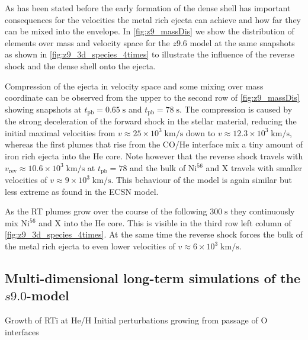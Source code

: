 \documentclass[fleqn,usenatbib]{mnras}
\newcommand{\nickel}{$\mathrm{Ni^{56}}$\xspace}
\newcommand{\tracer}{$\mathrm{X}$\xspace}
\newcommand{\COM}[1]{{\color{red}#1}}
\begin{document}
As has been stated before the early formation of the dense shell has important consequences for the velocities the  metal rich ejecta can achieve and how far they can be mixed into the envelope.
In \autoref{fig:z9_massDis} we show the distribution of elements over mass and velocity space for the $z9.6$ model at the same snapshots as shown in \autoref{fig:z9_3d_species_4times} to illustrate the influence of the reverse shock and the dense shell onto the ejecta.

Compression of the ejecta in velocity space and some mixing over mass coordinate can be observed from the upper to the second row of \autoref{fig:z9_massDis} showing snapshots at $t_{\mathrm{pb}}=0.65\;\mathrm{s}$ and $t_{\mathrm{pb}}=78\;\mathrm{s}$. The compression is caused by the strong deceleration of the forward shock in the stellar material, reducing the initial maximal velocities from $v\approx 25\times10^3\;\mathrm{km/s}$ down to $v\approx 12.3\times10^3\;\mathrm{km/s}$, whereas the first plumes that rise from the CO/He interface mix a tiny amount of iron rich ejecta into the He core. Note however that the reverse shock travels with $v_{\mathrm{rev}}\approx 10.6\times10^3\;\mathrm{km/s}$ at $t_{\mathrm{pb}}=78$ and the bulk of \nickel and \tracer travels with smaller velocities of $v\approx 9\times10^3\;\mathrm{km/s}$. This behaviour of the model is again similar but less extreme as found in the ECSN model.

As the RT plumes grow over the course of the following $300\;\mathrm{s}$ they continuously mix \nickel and \tracer into the He core. This is visible in the third row left column of \autoref{fig:z9_3d_species_4times}. At the same time the reverse shock forces the bulk of the metal rich ejecta to even lower velocities of  $v\approx 6\times10^3\;\mathrm{km/s}$. 

\subsection{Multi-dimensional long-term simulations of the $s9.0$-model}
\label{subsec:Multi-dimensional long-term simulations of the s9.0-model}
\COM{Growth of RTi at He/H}
\COM{Initial perturbations growing from passage of O interfaces}
\end{document}
